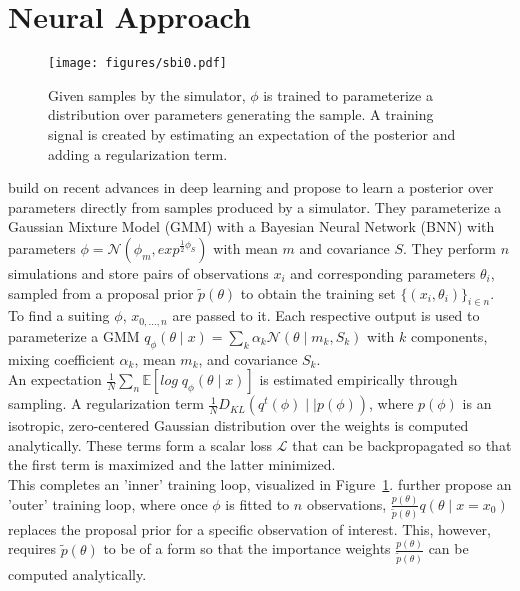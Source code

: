\documentclass[12pt]{article}
\begin{document}
 



\section*{Neural Approach}
\begin{figure}
	\centering
	\texttt{[image: figures/sbi0.pdf]}
	\caption{Given samples by the simulator, $\phi$ is trained to parameterize a distribution over parameters generating the sample. A training signal is created by estimating an expectation of the posterior and adding a regularization term.}
	\label{fig:sbiloop}
\end{figure} 
\citet{papamakarios2016fast} build on recent advances in deep learning and propose to learn a posterior over parameters directly from samples produced by a simulator. They parameterize a Gaussian Mixture Model (GMM) with a Bayesian Neural Network (BNN) with parameters $\phi = \mathcal{N}(\phi_m, exp^{\frac{1}{2}\phi_S})$ with mean $m$ and covariance $S$. They perform $n$ simulations and store pairs of observations $x_i$ and corresponding parameters $\theta_i$, sampled from a proposal prior $\tilde{p}(\theta)$ to obtain the  training set $\lbrace(x_i,\theta_i)\rbrace_{i \in n}$. 
To find a suiting $\phi$, $x_{0,...,n}$ are passed to it. Each respective output is used to parameterize a GMM $q_{\phi}(\theta\mid x) = \sum_k \alpha_k \mathcal{N}(\theta\mid m_k, S_k)$ with $k$ components, mixing coefficient $\alpha_k$, mean $m_k$, and covariance $S_k$.\\
An expectation $\frac{1}{N} \sum_n\mathbb{E} \left[ log\;q_{\phi}(\theta \mid x)\right]$ is estimated empirically through sampling. A regularization term $\frac{1}{N}\mathit{D}_{KL}(q^t(\phi) \mid\mid p(\phi))$, where $p(\phi)$ is an isotropic, zero-centered Gaussian distribution over the weights is computed analytically. These terms form a scalar loss $\mathcal{L}$ that can be backpropagated so that the first term is maximized and the latter minimized.\\
This completes an 'inner' training loop, visualized in Figure~\ref{fig:sbiloop}. \citet{papamakarios2016fast} further propose an 'outer' training loop, where once $\phi$ is fitted to $n$ observations, $\frac{p(\theta)}{\tilde{p}(\theta)}q(\theta \mid  x=x_0)$ replaces the proposal prior for a specific observation of interest. This, however, requires $\tilde{p}(\theta)$ to be of a form so that the importance weights $\frac{p(\theta)}{\tilde{p}(\theta)}$ can be computed analytically.
\end{document}
